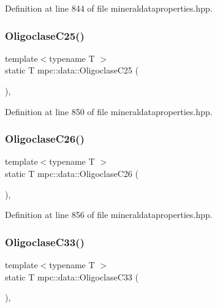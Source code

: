 Definition at line 844 of file mineraldataproperties.\+hpp.

\mbox{\label{namespacempc_1_1data_a36d3825843ccf8903e127e3ea028fdd2}} 
\subsubsection{\texorpdfstring{Oligoclase\+C25()}{OligoclaseC25()}}
{\footnotesize\ttfamily template$<$typename T $>$ \\
static T mpc\+::data\+::\+Oligoclase\+C25 (\begin{DoxyParamCaption}{ }\end{DoxyParamCaption})\hspace{0.3cm}{\ttfamily [inline]}, {\ttfamily [static]}}



Definition at line 850 of file mineraldataproperties.\+hpp.

\mbox{\label{namespacempc_1_1data_a73d2281395f90ec9dd33b08123094178}} 
\subsubsection{\texorpdfstring{Oligoclase\+C26()}{OligoclaseC26()}}
{\footnotesize\ttfamily template$<$typename T $>$ \\
static T mpc\+::data\+::\+Oligoclase\+C26 (\begin{DoxyParamCaption}{ }\end{DoxyParamCaption})\hspace{0.3cm}{\ttfamily [inline]}, {\ttfamily [static]}}



Definition at line 856 of file mineraldataproperties.\+hpp.

\mbox{\label{namespacempc_1_1data_acad833c03164b8545eed13ac587783af}} 
\subsubsection{\texorpdfstring{Oligoclase\+C33()}{OligoclaseC33()}}
{\footnotesize\ttfamily template$<$typename T $>$ \\
static T mpc\+::data\+::\+Oligoclase\+C33 (\begin{DoxyParamCaption}{ }\end{DoxyParamCaption})\hspace{0.3cm}{\ttfamily [inline]}, {\ttfamily [static]}}



